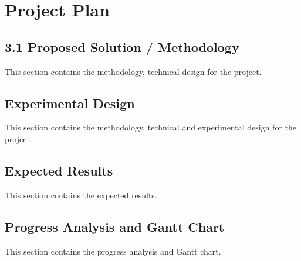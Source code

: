 \section{Project Plan}

\subsection{3.1	Proposed Solution / Methodology}
This section contains the methodology, technical design for the project. 

\subsection{Experimental Design}
This section contains the methodology, technical and experimental design for the project. 

\subsection{Expected Results}
This section contains the expected results.

\subsection{Progress Analysis and Gantt Chart}
This section contains the progress analysis and Gantt chart. 
